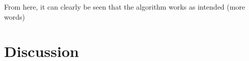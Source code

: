 \documentclass{physics_article_B}
\begin{document}
        From here, it can clearly be seen that the algorithm works as intended (more words)
    
\section{Discussion}




\newpage



    

\end{document}
